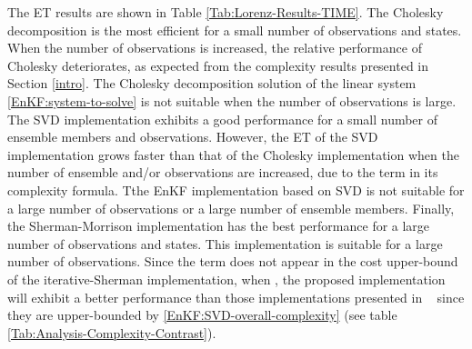 \documentclass[12pt]{article}
\begin{document}
The ET results are shown in Table  \ref{Tab:Lorenz-Results-TIME}.
The Cholesky decomposition is the most efficient for a small number of observations and states. 
When the number of observations is increased, the relative performance of Cholesky deteriorates, as expected from the complexity results presented in Section  \ref{intro}. The Cholesky decomposition solution of the linear system \eqref{EnKF:system-to-solve} is not suitable when the number of observations is large. The SVD implementation exhibits a good performance for a small number of ensemble members and observations. However, the ET of the SVD implementation grows faster than that of the Cholesky implementation when the number of ensemble and/or observations are increased, due to the term  in its complexity formula. Tthe EnKF implementation based on SVD is not suitable  for a large  number of observations or a large number of ensemble members. Finally, the Sherman-Morrison implementation has the best performance for a large number of observations and states. This implementation is suitable for a large number of observations. Since the term  does not appear in the cost upper-bound of the iterative-Sherman implementation, when , the proposed implementation will exhibit a better performance than those implementations presented in ~\cite{Anderson01,Anderson07,Tippett2003} since they are upper-bounded by  \eqref{EnKF:SVD-overall-complexity} (see table  \ref{Tab:Analysis-Complexity-Contrast}). 
\end{document}
